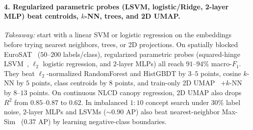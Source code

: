 \paragraph{4. Regularized parametric probes (LSVM, logistic/Ridge, 2-layer MLP) beat centroids, $k$-NN, trees, and 2D UMAP.}
\emph{Takeaway:} start with a linear SVM or logistic regression on the embeddings before trying nearest neighbors, trees, or 2D projections. \label{sec:lesson_probes}
On spatially blocked EuroSAT~\cite{helber2019eurosat} ($50\text{--}200$ labels/class), regularized parametric probes (squared-hinge LSVM~\cite{cortes1995svm,fan2008liblinear}, $\ell_2$ logistic regression, and $2$-layer MLPs) all reach $91\text{--}94\%$ macro-$F_1$. They beat $\ell_2$-normalized RandomForest and HistGBDT by $3\text{--}5$ points, cosine $k$-NN by $5$ points, class centroids by $8$ points, and train-only 2D UMAP~\cite{mcinnes2018umap} $+ k$-NN by $8\text{--}13$ points. On continuous NLCD canopy regression, 2D UMAP also drops $R^2$ from $0.85\text{--}0.87$ to $0.62$. In imbalanced $1{:}10$ concept search under $30\%$ label noise, $2$-layer MLPs and LSVMs ($\sim 0.90\text{ AP}$) also beat nearest-neighbor Max-Sim~\cite{johnson2021faiss} ($0.37\text{ AP}$) by learning negative-class boundaries.
